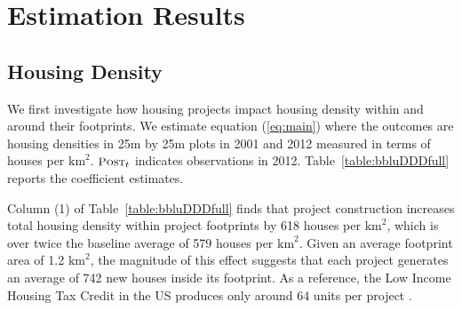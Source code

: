 \documentclass[12pt]{article}
\begin{document}
 



\section{Estimation Results}\label{section:results}





\subsection{Housing Density}\label{section:bbluestimates}

We first investigate how housing projects impact housing density within and around their footprints.  We estimate equation (\ref{eq:main}) where the outcomes are housing densities in 25m by 25m plots in 2001 and 2012 measured in terms of houses per $\text{km}^{2}$.  $\textsc{\small Post}_{t}$ indicates observations in 2012.  Table~\ref{table:bbluDDDfull} reports the coefficient estimates.

Column (1) of Table~\ref{table:bbluDDDfull} finds that project construction increases total housing density within project footprints by 618 houses per $\text{km}^{2}$, which is over twice the baseline average of 579 houses per $\text{km}^{2}$.  Given an average footprint area of 1.2 $\text{km}^{2}$, the magnitude of this effect suggests that each project generates an average of 742 new houses inside its footprint.  As a reference, the Low Income Housing Tax Credit in the US produces only around 64 units per project \citep{diamond2016wants}.
\end{document}

